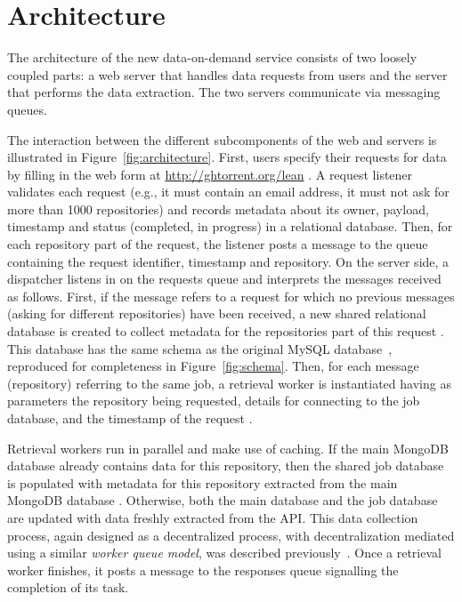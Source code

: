 
\section{Architecture}
\label{sec:arch}

The architecture of the new \ght data-on-demand service consists of two loosely coupled parts:
a web server that handles data requests from users and the \ght server that performs the data extraction.
The two servers communicate via messaging queues.

The interaction between the different subcomponents of the web and \ght servers is illustrated in
Figure~\ref{fig:architecture}.
First, users specify their requests for data by filling in the web form at \url{http://ghtorrent.org/lean} .
A request listener validates each request (e.g., it must contain an email address, it must not ask for
more than 1000 repositories)
and records metadata about its owner, payload,
timestamp and status (completed, in progress) in
a relational database.
Then, for each \gh repository part of the request, the listener posts a message to the queue 
containing the request identifier, timestamp and repository.
%
On the \ght server side, a dispatcher listens in on the requests queue  and interprets the
messages received as follows.
First, if the message refers to a request for which no previous messages (asking for different repositories)
have been received, a new shared relational database is created to collect metadata for the repositories part
of this request .
This database has the same schema as the original \ght MySQL database~\cite{gousios2012ghtorent},
reproduced for completeness in Figure~\ref{fig:schema}.
Then, for each message (repository) referring to the same job, a retrieval worker is instantiated having
as parameters the repository being requested, details for connecting to the job database, and the
timestamp of the request .

Retrieval workers run in parallel and make use of caching.
If the main \ght MongoDB database already contains data for this repository,
then the shared job database is populated with metadata for this
repository extracted from the main \ght MongoDB database .
Otherwise, both the main \ght database and the job database  are updated with data freshly extracted
from the \gh API.
This data collection process, again designed as a decentralized process, with decentralization mediated
using a similar \emph{worker queue model}, was described previously~\cite{gousios2013ghtorent}.
Once a retrieval worker finishes, it posts a message to the responses queue  signalling
the completion of its task.

